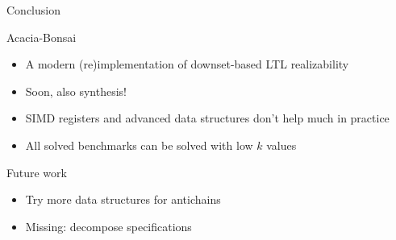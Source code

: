 \documentclass[aspectratio=169]{beamer}
\begin{document}
\begin{frame}{Conclusion}
  \begin{block}{Acacia-Bonsai}
    \begin{itemize}
      \item A modern (re)implementation of downset-based LTL realizability
      \item Soon, \alert{also synthesis!}
      \item SIMD registers and advanced data structures don't help much in
        practice
      \item All solved benchmarks can be solved with low $k$ values
    \end{itemize}
  \end{block}

  \pause

  \begin{block}{Future work}
    \begin{itemize}
      \item Try more data structures for antichains
      \item Missing: decompose specifications
    \end{itemize}
  \end{block}
\end{frame}
\end{document}
